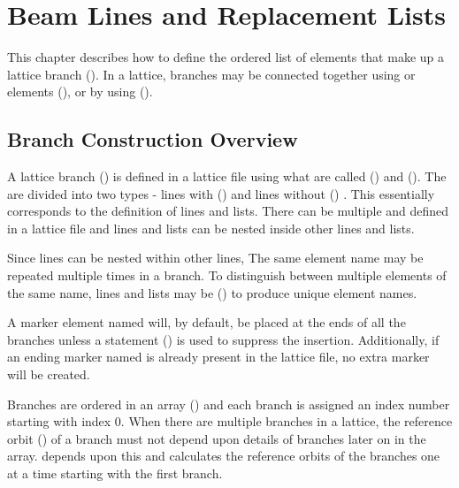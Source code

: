 \chapter{Beam Lines and Replacement Lists}
\label{c:sequence}

This chapter describes how to define the ordered list of elements that make up a lattice branch
().  In a lattice, branches may be connected together using  or
 elements (), or by using  ().

\section{Branch Construction Overview}
\label{s:branch.construct}

A lattice branch () is defined in a lattice file using what are called 
() and  ().  The  are
divided into two types - lines with () and lines without
() . This essentially corresponds to the \mad
definition of lines and lists. There can be multiple  and 
defined in a lattice file and lines and lists can be nested inside other lines and lists.

Since lines can be nested within other lines, The same element name may be repeated multiple times
in a branch. To distinguish between multiple elements of the same name, lines and lists may be
 () to produce unique element names.

A marker element named  will, by default, be placed at the ends of all the branches unless a
 statement () is used to suppress the insertion.
Additionally, if an ending marker named  is already present in the lattice file, no extra
marker will be created.

Branches are ordered in an array () and each branch is assigned an index number
starting with index 0. When there are multiple branches in a lattice, the reference orbit
() of a branch must not depend upon details of branches later on in the array.  \bmad
depends upon this and calculates the reference orbits of the branches one at a time starting with
the first branch.

